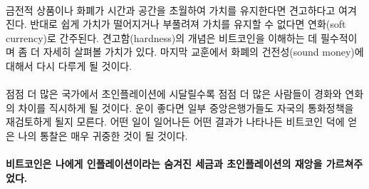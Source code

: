 \paragraph{}
금전적 상품이나 화폐가 시간과 공간을 초월하여 가치를 유지한다면 견고하다고 여겨진다. 
반대로 쉽게 가치가 떨어지거나 부풀려져 가치를 유지할 수 없다면 연화(soft currency)로 간주된다. 
견고함(hardness)의 개념은 비트코인을 이해하는 데 필수적이며 좀 더 자세히 살펴볼 가치가 있다.
마지막 교훈에서 화폐의 건전성(sound money)에 대해서 다시 다루게 될 것이다.


\paragraph{}
점점 더 많은 국가에서 초인플레이션에 시달릴수록 점점 더 많은 사람들이 경화와 연화의 차이를 직시하게 될 것이다. 
운이 좋다면 일부 중앙은행가들도 자국의 통화정책을 재검토하게 될지 모른다. 
어떤 일이 일어나든 어떤 결과가 나타나든 비트코인 덕에 얻은 나의 통찰은 매우 귀중한 것이 될 것이다.

\paragraph{비트코인은 나에게 인플레이션이라는 숨겨진 세금과 초인플레이션의 재앙을 가르쳐주었다.}


